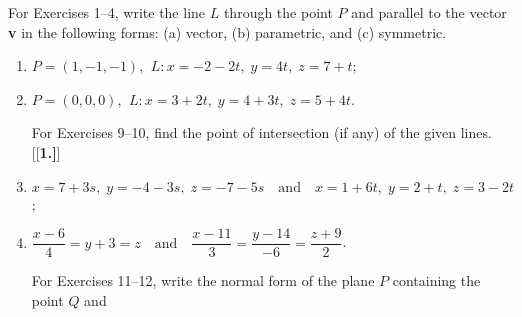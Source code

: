 \centerline{}\label{sec1dot5}
\par\noindent For Exercises 1--4, write the line $L$ through the point $P$ and parallel to the vector \textbf{v} in the
 following forms: (a) vector, (b) parametric, and (c) symmetric.
\begin{enumerate}[\bfseries 1.]
\par\noindent For Exercises 5--6, write the line $L$ through the points $\ssub{P}{1}$ and $\ssub{P}{2}$ in parametric
form.
[{[\bfseries 1.]}]
\par\noindent For Exercises 7--8, find the distance $d$ from the point $P$ to the line $L$.
[{[\bfseries 1.]}]
 \item $P = (1,-1,-1)$, $~L: x = -2 - 2t, \; y = 4t, \; z = 7 + t$;
 \item $P = (0,0,0)$, $~L: x = 3 + 2t, \; y = 4 + 3t, \; z = 5 + 4t$.
\par\noindent For Exercises 9--10, find the point of intersection (if any) of the given lines.
[{[\bfseries 1.]}]
 \item $x = 7 + 3s, \; y = -4 - 3s, \; z = -7 - 5s \quad \text{and} \quad x = 1 + 6t, \; y = 2 + t, \; z = 3 - 2t$;
 \item $\dfrac{x - 6}{4} = y + 3 = z \quad \text{and} \quad \dfrac{x - 11}{3} = \dfrac{y - 14}{-6} =
  \dfrac{z + 9}{2}$.
\par\noindent For Exercises 11--12, write the normal form of the plane $P$ containing the point $Q$ and

\end{enumerate}
